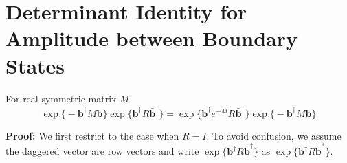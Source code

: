 \documentclass{article}
\renewcommand{\vec}[1]{\boldsymbol{\mathbf{#1}}}
\begin{document}


\section{Determinant Identity for Amplitude between Boundary States}
\label{app:pf_of_id}

For real symmetric matrix $M$
\begin{equation}
\exp\Big\{- \vec{b}^{\dagger} M \vec{b}  \Big\} \exp \Big\{ \vec{b}^{\dagger} R \bar{\vec{b}}^{\dagger}  \Big\}  = \exp \Big\{ \vec{b}^{\dagger} e^{-M}  R \bar{\vec{b}}^{\dagger}  \Big\} \exp\Big\{- \vec{b}^{\dagger} M \vec{b}  \Big\} 
\end{equation}

{\bf Proof:}  
We first restrict to the case when $R = I$. To avoid confusion, we assume the daggered vector are row vectors and write $\exp \Big\{ \vec{b}^{\dagger} R \bar{\vec{b}}^{\dagger}  \Big\} $ as $\exp \Big\{ \vec{b}^{\dagger} R \bar{\vec{b}}^{*}  \Big\} $. 
\end{document}
